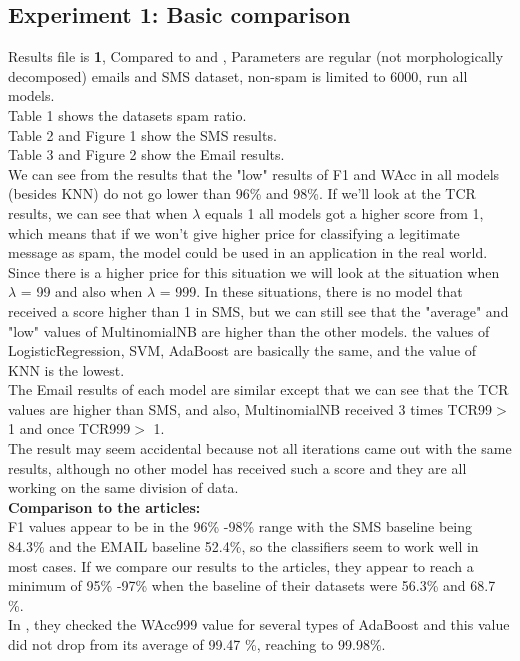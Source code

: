 \documentclass[11pt,a4paper]{article}
\begin{document}
\subsection{Experiment 1: Basic comparison}
\label{ssec:Experiment 1}
Results file is \textbf{1}, Compared to \citep{andrew2007scalable} and \citep{Ando2005}, Parameters are regular (not morphologically decomposed) emails and SMS dataset, non-spam is limited to 6000, run all models.\\
Table 1 shows the datasets spam ratio.\\
Table 2 and Figure 1 show the SMS results.\\
Table 3 and Figure 2 show the Email results.\\
We can see from the results that the "low" results of F1 and WAcc in all models (besides KNN) do not go lower than 96\% and 98\%.
If we'll look at the TCR results, we can see that when $\lambda$ equals 1 all models got a higher score from 1, which means that if we won't give higher price for classifying a legitimate message as spam, the model could be used in an application in the real world.
Since there is a higher price for this situation we will look at the situation when $\lambda$ = 99 and also when $\lambda$ = 999. In these situations, there is no model that received a score higher than 1 in SMS, but we can still see that the "average" and "low" values of MultinomialNB are higher than the other models. the values of LogisticRegression, SVM, AdaBoost are basically the same, and the value of KNN is the lowest.\\
The Email results of each model are similar except that we can see that the TCR values are higher than SMS, and also, MultinomialNB received 3 times TCR99${>}$ 1 and once TCR999${>}$ 1.\\
The result may seem accidental because not all iterations came out with the same results, although no other model has received such a score and they are all working on the same division of data.\\
\textbf{Comparison to the articles:}\\
F1 values appear to be in the 96\% -98\% range with the SMS baseline being 84.3\% and the EMAIL baseline 52.4\%, so the classifiers seem to work well in most cases. If we compare our results to the articles, they appear to reach a minimum of 95\% -97\% when the baseline of their datasets were 56.3\% and 68.7 \%.\\
In \citep{Ando2005}, they checked the WAcc999 value for several types of AdaBoost and this value did not drop from its average of 99.47 \%, reaching to 99.98\%.
\end{document}
